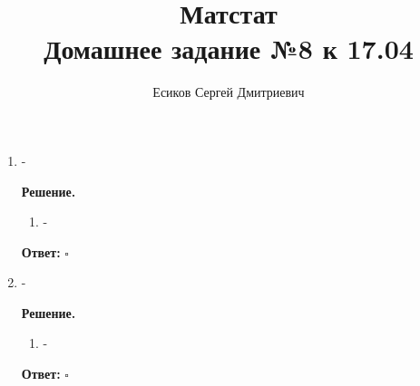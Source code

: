 \documentclass[12pt]{article}
\title{\textbf{Матстат}\\Домашнее задание №8 к 17.04}
\author{Есиков Сергей Дмитриевич}
\newenvironment{solution}{\textbf{Решение.}\par}{\hfill\(\square\)}
\newcommand{\answer}[1]{\textbf{Ответ:} \boxed{#1}}
\begin{document}
\maketitle

\begin{enumerate}[label=\textbf{\arabic*.}, left=0pt]
    \item -
          
    \begin{solution}
              \begin{enumerate}
                  \item -
              \end{enumerate}
              \answer{-}
          \end{solution}
    
    \item -
          
    \begin{solution}
              \begin{enumerate}
                  \item -
              \end{enumerate}
              \answer{-}
          \end{solution}
\end{enumerate}
\end{document}
